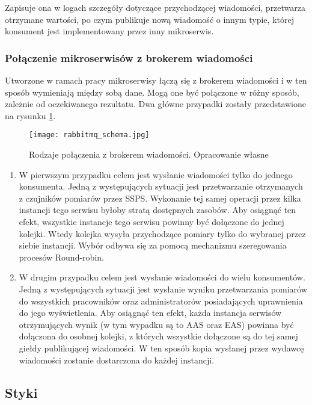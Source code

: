 Zapisuje ona w logach szczegóły dotyczące przychodzącej wiadomości, przetwarza 
otrzymane wartości, po czym publikuje nową wiadomość o innym typie, której konsument 
jest implementowany przez inny mikroserwis.

\subsubsection{Połączenie mikroserwisów z brokerem wiadomości}

Utworzone w ramach pracy mikroserwisy łączą się z brokerem wiadomości i w ten sposób wymieniają między
sobą dane. Mogą one być połączone w różny sposób, zależnie od oczekiwanego rezultatu. Dwa główne
przypadki zostały przedstawione na rysunku \ref{fig:rabbitmq-polaczenie}.

\begin{figure}[h]
    \centering
    \texttt{[image: rabbitmq\_schema.jpg]}
    \caption{Rodzaje połączenia z brokerem wiadomości. Opracowanie własne}
    \label{fig:rabbitmq-polaczenie}
\end{figure}

\begin{enumerate}
    \item W pierwszym przypadku celem jest wysłanie wiadomości tylko do jednego konsumenta. Jedną
    z występujących sytuacji jest przetwarzanie otrzymanych z czujników pomiarów przez SSPS. 
    Wykonanie tej samej operacji przez kilka instancji tego serwisu byłoby stratą
    dostępnych zasobów. Aby osiągnąć ten efekt, wszystkie instancje tego serwisu powinny być dołączone 
    do jednej kolejki. Wtedy kolejka wysyła przychodzące pomiary tylko do wybranej przez siebie instancji.
    Wybór odbywa się za pomocą mechanizmu szeregowania procesów Round-robin.
    \item W drugim przypadku celem jest wysłanie wiadomości do wielu konsumentów. Jedną z występujących
    sytuacji jest wysłanie wyniku przetwarzania pomiarów do wszystkich pracowników oraz administratorów
    posiadających uprawnienia do jego wyświetlenia. Aby osiągnąć ten efekt, każda instancja serwisów
    otrzymujących wynik (w tym wypadku są to AAS oraz EAS)
    powinna być dołączona do osobnej kolejki, z których wszystkie dołączone są do tej samej giełdy
    publikującej wiadomości. W ten sposób kopia wysłanej przez wydawcę wiadomości zostanie dostarczona
    do każdej instancji.
\end{enumerate}

\subsection{Styki}

